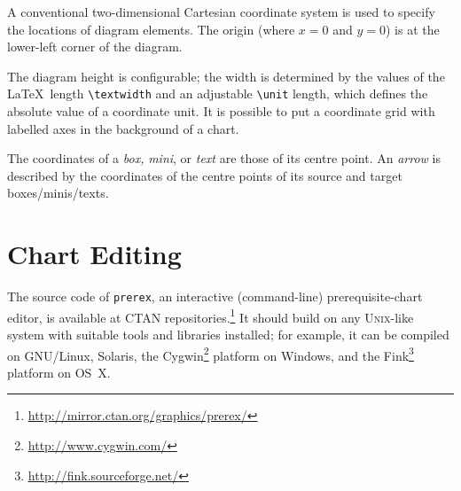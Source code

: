 \documentclass[11pt]{article}
\def\LaTeX{\mbox{LaTeX}}
\newcommand{\myurl}[1]{\textcolor{blue}{\underline{\textcolor{black}{\url{#1}}}}}
\begin{document}
A conventional two-dimensional
Cartesian coordinate system is used to specify the locations of
diagram elements.
The
origin (where
$x = 0$
and
$y = 0$)
is at the lower-left corner of the diagram. 

The diagram height is configurable; the width is determined by
the values of the \LaTeX\ length
\verb|\textwidth|
and
an adjustable
\verb|\unit|
length, which defines the absolute value of a coordinate unit.
It is possible to put a coordinate grid with labelled axes
in the background of a chart.

The coordinates of a
\emph{box,}
\emph{mini},
or
\emph{text}
are those of its centre point.  
An
\emph{arrow} 
is described by the
coordinates of the centre points of its source and target boxes/minis/texts. 

\section{Chart Editing}
\label{editor}
The source code of \texttt{prerex}, an interactive (command-line) prerequisite-chart editor,  is available at
CTAN repositories.\footnote{\myurl{http://mirror.ctan.org/graphics/prerex/}} 
It should build on any \textsc{Unix}-like system with
suitable tools and libraries installed; for example, it can be compiled
on GNU/Linux, Solaris, the Cygwin\footnote{\myurl{http://www.cygwin.com/}}
platform on Windows, 
and the Fink\footnote{\myurl{http://fink.sourceforge.net/}} platform
on OS~X.
\end{document}
